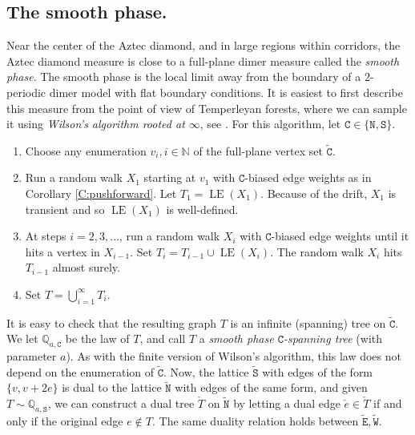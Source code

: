 \documentclass[11pt,twoside]{amsart}
\theoremstyle{plain}
\numberwithin{quest}{section}
\theoremstyle{remark}
\numberwithin{rem}{section}
\theoremstyle{definition}
\newcommand{\Q}{\mathbb{Q}}
\newcommand{\N}{\mathbb{N}}
\renewcommand{\tt}[1]{{\mathtt{#1}}}
\begin{document}
	\subsection{The smooth phase.} \label{S:smooth-phase-def} \qquad 
	Near the center of the Aztec diamond, and in large regions within corridors, the Aztec diamond measure is close to a full-plane dimer measure called the \emph{smooth phase}. The smooth phase is the local limit away from the boundary of a $2$-periodic dimer model with flat boundary conditions. It is easiest to first describe this measure from the point of view of Temperleyan forests, where we can sample it using \emph{Wilson's algorithm rooted at $\infty$}, see \cite{BLPS01}. For this algorithm, let $\tt{C} \in \{\tt{N}, \tt{S}\}$.
	\begin{enumerate}[label=\arabic*.]
		\item Choose any enumeration $v_i,i \in \N$ of the full-plane vertex set $\tt{\tilde C}$.
		\item Run a random walk $X_1$ starting at $v_1$ with $\tt{C}$-biased edge weights as in Corollary \ref{C:pushforward}. Let $T_1 = \operatorname{LE}(X_1)$. Because of the drift, $X_1$ is transient and so $\operatorname{LE}(X_1)$ is well-defined.
		\item At steps $i = 2, 3, \dots$, run a random walk $X_i$ with $\tt{C}$-biased edge weights until it hits a vertex in $X_{i-1}$. Set $T_i = T_{i-1} \cup \operatorname{LE}(X_i)$. The random walk $X_i$ hits $T_{i-1}$ almost surely.
		\item Set $T = \bigcup_{i=1}^\infty T_i$.
	\end{enumerate}
	It is easy to check that the resulting graph $T$ is an infinite (spanning) tree on $\tt{\tilde C}$.  
	We let $\Q_{a, \tt{C}}$ be the law of $T$, and call $T$ a \emph{smooth phase $\tt{C}$-spanning tree} (with parameter $a$).
	As with the finite version of Wilson's algorithm, this law does not depend on the enumeration of $\tt{\tilde C}$. Now, the lattice $\tt{\tilde S}$ with edges of the form $\{v, v + 2 e\}$ is dual to the lattice $\tt{\tilde N}$ with edges of the same form, and given $T \sim \Q_{a, \tt{S}}$, we can construct a dual tree $\check T$ on $\tt{\tilde N}$ by letting a dual edge $\check e \in \check T$ if and only if the original edge $e \notin T$. The same duality relation holds between $\tt{\tilde E}, \tt{\tilde W}$.
	
\end{document}

